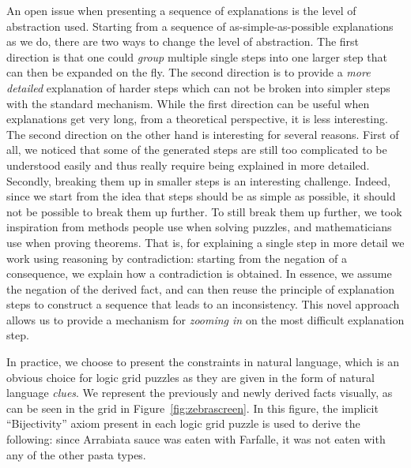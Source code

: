 An open issue when presenting a sequence of explanations is the level of abstraction used.
Starting from a sequence of as-simple-as-possible explanations as we do, there are two ways to change the level of abstraction.
The first direction is that one could \emph{group} multiple single steps into one larger step that can then be expanded on the fly. 
The second direction is to provide a \emph{more detailed} explanation of harder steps which can not be broken into simpler steps with the standard mechanism.
While the first direction can be useful when explanations get very long, from a theoretical perspective, it is less interesting. 
The second direction on the other hand is interesting for several reasons. First of all, we noticed that some of the generated steps are still too complicated to be understood easily and thus really require being explained in more detailed. Secondly, breaking them up in smaller steps is an interesting challenge. Indeed, since we start from the idea that steps should be as simple as possible, it should not be possible to break them up further. 
To still break them up further, we took inspiration from methods people use when solving puzzles, and mathematicians use when proving theorems. 
That is, for explaining a single step in more detail we work using reasoning by contradiction: starting from the negation of a consequence, we explain how a contradiction is obtained.  In essence, we assume the negation of the derived fact, and can then reuse the principle of explanation steps to construct a sequence that leads to an inconsistency. 
This novel approach allows us to provide a mechanism for \emph{zooming in} on the most difficult explanation step.

In practice, we choose to present the constraints in natural language, which is an obvious choice for logic grid puzzles as they are given in the form of natural language \textit{clues}. 
We represent the previously and newly derived facts visually, as can be seen in the grid in Figure~\ref{fig:zebrascreen}. In this figure, the implicit ``Bijectivity'' axiom present in each logic grid puzzle is used to derive the following: since Arrabiata sauce was eaten with Farfalle, it was not eaten with any of the other pasta types.

